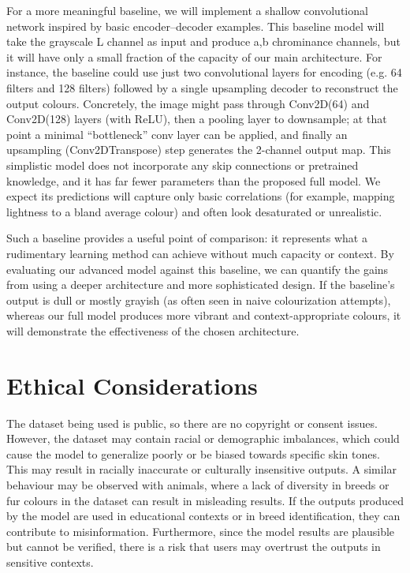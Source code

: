 \documentclass{article} %
\begin{document}
For a more meaningful baseline, we will implement a shallow convolutional network inspired by basic encoder–decoder examples. \cite{leatvanich2025image} This baseline model will take the grayscale L channel as input and produce a,b chrominance channels, but it will have only a small fraction of the capacity of our main architecture. For instance, the baseline could use just two convolutional layers for encoding (e.g. 64 filters and 128 filters) followed by a single upsampling decoder to reconstruct the output colours. Concretely, the image might pass through Conv2D(64) and Conv2D(128) layers (with ReLU), then a pooling layer to downsample; at that point a minimal “bottleneck” conv layer can be applied, and finally an upsampling (Conv2DTranspose) step generates the 2-channel output map. \cite{leatvanich2025image} This simplistic model does not incorporate any skip connections or pretrained knowledge, and it has far fewer parameters than the proposed full model. We expect its predictions will capture only basic correlations (for example, mapping lightness to a bland average colour) and often look desaturated or unrealistic. \cite{rosebrock2019bwcolorization}

Such a baseline provides a useful point of comparison: it represents what a rudimentary learning method can achieve without much capacity or context. By evaluating our advanced model against this baseline, we can quantify the gains from using a deeper architecture and more sophisticated design. If the baseline’s output is dull or mostly grayish (as often seen in naive colourization attempts), whereas our full model produces more vibrant and context-appropriate colours, it will demonstrate the effectiveness of the chosen architecture. \cite{rosebrock2019bwcolorization}

\section{Ethical Considerations}
\label{ethical}

The dataset being used is public, so there are no copyright or consent issues. However, the dataset may contain racial or demographic imbalances, which could cause the model 
to generalize poorly or be biased towards specific skin tones. This may result in racially inaccurate or culturally insensitive outputs. A similar behaviour may be observed with 
animals, where a lack of diversity in breeds or fur colours in the dataset can result in misleading results. If the outputs produced by the model are used in educational contexts 
or in breed identification, they can contribute to misinformation. Furthermore, since the model results are plausible but cannot be verified, there is a risk that users may 
overtrust the outputs in sensitive contexts.
\end{document}
